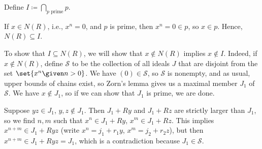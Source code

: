 Define $I\coloneqq \bigcap_{p\text{ prime}} p$.

If $x \in N(R)$, i.e., $x^n = 0$, and $p$ is prime, then $x^n = 0 \in p$, so
$x \in p$. Hence, $N(R) \subseteq I$.

To show that $I \subseteq N(R)$, we will show that $x \notin N(R)$ implies
$x \notin I$. Indeed, if $x \notin N(R)$, define $\mathcal{S}$ to be the collection
of all ideals $J$ that are disjoint from the set $\set{x^n \given n > 0}$.
We have $(0) \in \mathcal{S}$, so $\mathcal{S}$ is nonempty, and as usual,
upper bounds of chains exist, so Zorn's lemma gives us a maximal member
$J_1$ of $\mathcal{S}$. We have $x \notin J_1$, so if we can show that $J_1$ is
prime, we are done.

Suppose $yz \in J_1$, $y, z \notin J_1$. Then $J_1 + Ry$ and $J_1 + Rz$ are strictly
larger than $J_1$, so we find $n, m$ such that $x^n \in J_1 + Ry$, $x^m \in J_1 + Rz$.
This implies $x^{n + m} \in J_1 + Ryz$ (write $x^n = j_1+r_1y$, $x^m = j_2+r_2z$),
but then $x^{n + m} \in J_1 + Ryz = J_1$, which is a contradiction because
$J_1 \in \mathcal{S}$.
